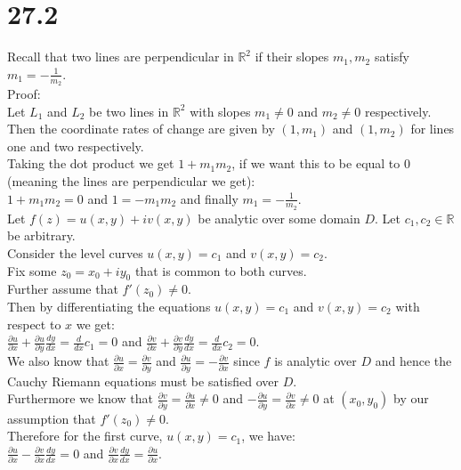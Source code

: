 \documentclass{article}
\begin{document}
\section*{27.2}
\begin{center}
    \doublespacing
    Recall that two lines are perpendicular in $\mathbb{R}^2$ if their slopes $m_1, m_2$ satisfy $m_1 =-\frac{1}{m_2}$.
    \\Proof:
    \\Let $L_1$ and $L_2$ be two lines in $\mathbb{R}^2$ with slopes $m_1\neq 0$ and $m_2\neq 0$ respectively.
    \\Then the coordinate rates of change are given by $(1, m_1)$ and $(1, m_2)$ for lines one and two respectively.
    \\Taking the dot product we get $1 + m_1 m_2$, if we want this to be equal to 0 (meaning the lines are perpendicular we get):
    \\$1 + m_1 m_2 = 0$ and $1 = - m_1 m_2$ and finally $m_1 =-\frac{1}{m_2}$.
    \break
    \\Let $f(z) = u(x, y) + iv(x, y)$ be analytic over some domain $D$. Let $c_1, c_2\in\mathbb{R}$ be arbitrary.
    \\Consider the level curves $u(x, y) = c_1$ and $v(x, y) = c_2$.
    \\Fix some $z_0 = x_0 + iy_0$ that is common to both curves.
    \\Further assume that $f'(z_0)\neq 0$.
    \\Then by differentiating the equations $u(x, y) = c_1$ and $v(x, y) = c_2$ with respect to $x$ we get:
    \\$\frac{\partial u}{\partial x} +\frac{\partial u}{\partial y}\frac{dy}{dx} =\frac{d}{dx} c_1 = 0$ and $\frac{\partial v}{\partial x} +\frac{\partial v}{\partial y}\frac{dy}{dx} =\frac{d}{dx} c_2 = 0$.
    \\We also know that $\frac{\partial u}{\partial x} =\frac{\partial v}{\partial y}$ and $\frac{\partial u}{\partial y} = -\frac{\partial v}{\partial x}$ since $f$ is analytic over $D$ and hence the Cauchy Riemann equations must be satisfied over $D$.
    \\Furthermore we know that $\frac{\partial v}{\partial y} =\frac{\partial u}{\partial x}\neq 0$ and $-\frac{\partial u}{\partial y} = \frac{\partial v}{\partial x}\neq 0$ at $(x_0, y_0)$ by our assumption that $f'(z_0)\neq 0$.
    \break
    \\Therefore for the first curve, $u(x, y) = c_1$, we have:
    \\$\frac{\partial u}{\partial x} -\frac{\partial v}{\partial x}\frac{dy}{dx} = 0$ and $\frac{\partial v}{\partial x}\frac{dy}{dx} =\frac{\partial u}{\partial x}$.

\end{center}
\end{document}
